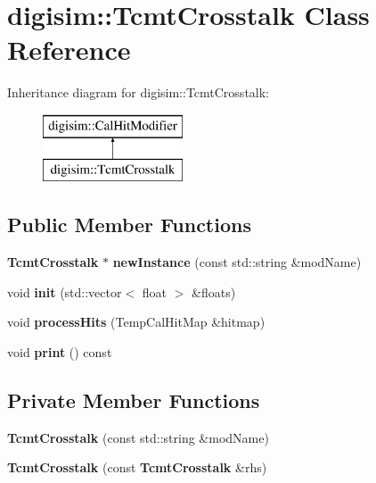 \section{digisim\-:\-:Tcmt\-Crosstalk Class Reference}
\label{classdigisim_1_1TcmtCrosstalk}
Inheritance diagram for digisim\-:\-:Tcmt\-Crosstalk\-:\begin{figure}[H]
\begin{center}
\leavevmode
\includegraphics[height=2.000000cm]{classdigisim_1_1TcmtCrosstalk}
\end{center}
\end{figure}
\subsection*{Public Member Functions}
\begin{DoxyCompactItemize}
\item 
{\bf Tcmt\-Crosstalk} $\ast$ {\bfseries new\-Instance} (const std\-::string \&mod\-Name)\label{classdigisim_1_1TcmtCrosstalk_a0cec6dfca13d00791a0aaad3271f5739}

\item 
void {\bfseries init} (std\-::vector$<$ float $>$ \&floats)\label{classdigisim_1_1TcmtCrosstalk_a68c9d3d0aacc848ce0257df9c795d552}

\item 
void {\bfseries process\-Hits} (Temp\-Cal\-Hit\-Map \&hitmap)\label{classdigisim_1_1TcmtCrosstalk_af58027092df6d4082b99ea5fc6046cb2}

\item 
void {\bfseries print} () const \label{classdigisim_1_1TcmtCrosstalk_adb647c962aae704cd31c767fcf78532a}

\end{DoxyCompactItemize}
\subsection*{Private Member Functions}
\begin{DoxyCompactItemize}
\item 
{\bfseries Tcmt\-Crosstalk} (const std\-::string \&mod\-Name)\label{classdigisim_1_1TcmtCrosstalk_aa596f349686f6ab1e96e1fdfcaf43dd1}

\item 
{\bfseries Tcmt\-Crosstalk} (const {\bf Tcmt\-Crosstalk} \&rhs)\label{classdigisim_1_1TcmtCrosstalk_adbbdc315429667a84499815e415c845c}

\end{DoxyCompactItemize}
